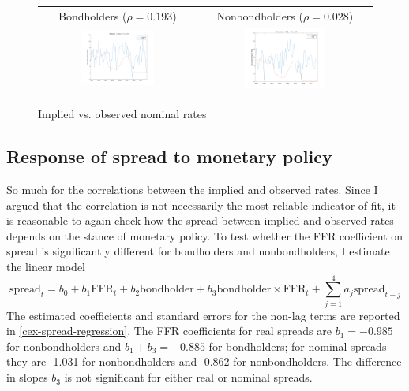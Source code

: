 \begin{figure}[h!]
\ContinuedFloat
\centering
\begin{tabular}{cc}
Bondholders ($\rho = 0.193$) & Nonbondholders ($\rho = 0.028$) \\
\includegraphics[width=0.49\textwidth]{figs/cex/implied-vs-ffr/bh_nominal} &
\includegraphics[width=0.49\textwidth]{figs/cex/implied-vs-ffr/nbh_nominal}
\end{tabular}
\caption{Implied vs. observed nominal rates}
\label{implied-vs-ffr-cex-nominal}
\end{figure}



\subsection{Response of spread to monetary policy}
So much for the correlations between the implied and observed rates. Since I argued that the correlation is not necessarily the most reliable indicator of fit, it is reasonable to again check how the spread between implied and observed rates depends on the stance of monetary policy. To test whether the FFR coefficient on spread is significantly different for bondholders and nonbondholders, I estimate the linear model
\begin{equation}
\label{spread-ffr-bondholder-regression}
\mathrm{spread}_t = b_0 + b_1 \mathrm{FFR}_t + b_2 \mathrm{bondholder} + b_3 \mathrm{bondholder} \times \mathrm{FFR}_t + \sum_{j=1}^4 a_j \mathrm{spread}_{t-j}
\end{equation}
The estimated coefficients and standard errors for the non-lag terms are reported in \autoref{cex-spread-regression}. The FFR coefficients for real spreads are $b_1 = -0.985$ for nonbondholders and $b_1 + b_3 = -0.885$ for bondholders; for nominal spreads they are -1.031 for nonbondholders and -0.862 for nonbondholders. The difference in slopes $b_3$ is not significant for either real or nominal spreads.

